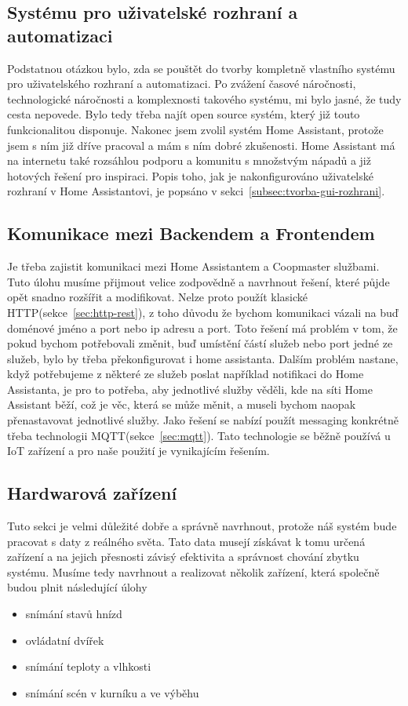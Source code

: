 \subsection{Systému pro uživatelské rozhraní a automatizaci}\label{subsec:systemu-pro-uzivatelske-rozhrani-a-automatizaci}
Podstatnou otázkou bylo, zda se pouštět do tvorby kompletně vlastního systému pro uživatelského rozhraní a automatizaci.
Po zvážení časové náročnosti, technologické náročnosti a komplexnosti takového systému, mi bylo jasné, že tudy cesta nepovede.
Bylo tedy třeba najít open source systém, který již touto funkcionalitou disponuje.
Nakonec jsem zvolil systém Home Assistant, protože jsem s ním již dříve pracoval a mám s ním dobré zkušenosti.
Home Assistant má na internetu také rozsáhlou podporu a komunitu s množstvým nápadů a již hotových řešení pro inspiraci.
Popis toho, jak je nakonfigurováno uživatelské rozhraní v Home Assistantovi, je popsáno v sekci~\ref{subsec:tvorba-gui-rozhrani}.

\subsection{Komunikace mezi Backendem a Frontendem}\label{subsec:komunikace-mezi-backendem-a-frontendem}
Je třeba zajistit komunikaci mezi Home Assistantem a Coopmaster službami.
Tuto úlohu musíme přijmout velice zodpovědně a navrhnout řešení, které půjde opět snadno rozšířit a modifikovat.
Nelze proto použít klasické HTTP(sekce~\ref{sec:http-rest}), z toho důvodu že bychom komunikaci vázali na buď doménové jméno a port nebo ip adresu a port.
Toto řešení má problém v tom, že pokud bychom potřebovali změnit, buď umístění částí služeb nebo port jedné ze služeb, bylo by třeba překonfigurovat i home assistanta.
Dalším problém nastane, když potřebujeme z některé ze služeb poslat například notifikaci do Home Assistanta, je pro to potřeba, aby jednotlivé služby věděli, kde na síti Home Assistant běží, což je věc, která se může měnit, a museli bychom naopak přenastavovat jednotlivé služby.
Jako řešení se nabízí použít messaging konkrétně třeba technologii MQTT(sekce~\ref{sec:mqtt}).
Tato technologie se běžně používá u IoT zařízení a pro naše použití je vynikajícím řešením.

\subsection{Hardwarová zařízení}\label{subsec:hardwarova-zarizeni}
Tuto sekci je velmi důležité dobře a správně navrhnout, protože náš systém bude pracovat s daty z reálného světa.
Tato data musejí získávat k tomu určená zařízení a na jejich přesnosti závisý efektivita a správnost chování zbytku systému.
Musíme tedy navrhnout a realizovat několik zařízení, která společně budou plnit následující úlohy
\begin{itemize}
    \item snímání stavů hnízd
    \item ovládatní dvířek
    \item snímání teploty a vlhkosti
    \item snímání scén v kurníku a ve výběhu
\end{itemize}

